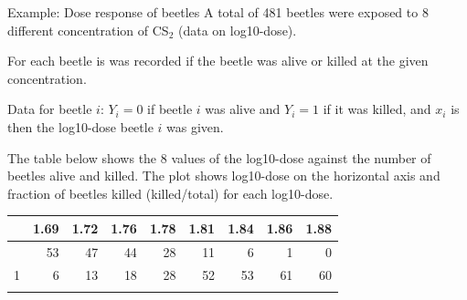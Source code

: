 \documentclass[
  ignorenonframetext,
]{beamer}
\newenvironment{Shaded}{\begin{snugshade}}{\end{snugshade}}
\newcommand{\AttributeTok}[1]{\textcolor[rgb]{0.13,0.29,0.53}{#1}}
\newcommand{\CommentTok}[1]{\textcolor[rgb]{0.56,0.35,0.01}{\textit{#1}}}
\newcommand{\ConstantTok}[1]{\textcolor[rgb]{0.56,0.35,0.01}{#1}}
\newcommand{\ControlFlowTok}[1]{\textcolor[rgb]{0.13,0.29,0.53}{\textbf{#1}}}
\newcommand{\DecValTok}[1]{\textcolor[rgb]{0.00,0.00,0.81}{#1}}
\newcommand{\FunctionTok}[1]{\textcolor[rgb]{0.13,0.29,0.53}{\textbf{#1}}}
\newcommand{\NormalTok}[1]{#1}
\newcommand{\OtherTok}[1]{\textcolor[rgb]{0.56,0.35,0.01}{#1}}
\newcommand{\SpecialCharTok}[1]{\textcolor[rgb]{0.81,0.36,0.00}{\textbf{#1}}}
\newcommand{\StringTok}[1]{\textcolor[rgb]{0.31,0.60,0.02}{#1}}
\begin{document}
\begin{frame}
\begin{block}{Example: Dose response of beetles}
\protect\hypertarget{example-dose-response-of-beetles}{}
A total of 481 beetles were exposed to 8 different concentration of
CS\(_2\) (data on log10-dose).

For each beetle is was recorded if the beetle was alive or killed at the
given concentration.

Data for beetle \(i\): \(Y_i=0\) if beetle \(i\) was alive and \(Y_i=1\)
if it was killed, and \(x_i\) is then the log10-dose beetle \(i\) was
given.
\end{block}
\end{frame}

\begin{frame}[fragile]
The table below shows the 8 values of the log10-dose against the number
of beetles alive and killed. The plot shows log10-dose on the horizontal
axis and fraction of beetles killed (killed/total) for each log10-dose.

\begin{Shaded}
\end{Shaded}

\begin{longtable}[]{@{}lrrrrrrrr@{}}
\toprule\noalign{}
& 1.69 & 1.72 & 1.76 & 1.78 & 1.81 & 1.84 & 1.86 & 1.88 \\
\midrule\noalign{}
\endhead
0 & 53 & 47 & 44 & 28 & 11 & 6 & 1 & 0 \\
1 & 6 & 13 & 18 & 28 & 52 & 53 & 61 & 60 \\
\bottomrule\noalign{}
\end{longtable}
\end{frame}
\end{document}
